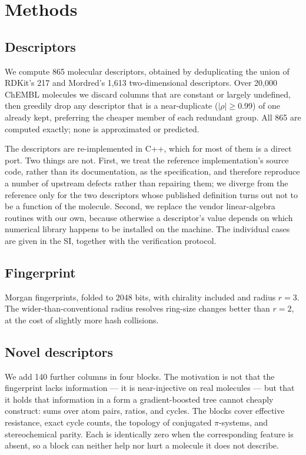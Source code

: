 \section{Methods}

\subsection{Descriptors}

We compute 865 molecular descriptors, obtained by deduplicating the union of RDKit's 217 and
Mordred's 1{,}613 two-dimensional descriptors. Over 20{,}000 ChEMBL molecules we discard columns
that are constant or largely undefined, then greedily drop any descriptor that is a
near-duplicate ($|\rho| \geq 0.99$) of one already kept, preferring the cheaper member of each
redundant group. All 865 are computed exactly; none is approximated or predicted.

The descriptors are re-implemented in C++, which for most of them is a direct port. Two things
are not. First, we treat the reference implementation's source code, rather than its
documentation, as the specification, and therefore reproduce a number of upstream defects rather
than repairing them; we diverge from the reference only for the two descriptors whose published
definition turns out not to be a function of the molecule. Second, we replace the vendor
linear-algebra routines with our own, because otherwise a descriptor's value depends on which
numerical library happens to be installed on the machine. The individual cases are given in the
SI, together with the verification protocol.

\subsection{Fingerprint}

Morgan fingerprints, folded to 2048 bits, with chirality included and radius $r = 3$. The
wider-than-conventional radius resolves ring-size changes better than $r = 2$, at the cost of
slightly more hash collisions.

\subsection{Novel descriptors}

We add 140 further columns in four blocks. The motivation is not that the fingerprint lacks
information --- it is near-injective on real molecules --- but that it holds that information in
a form a gradient-boosted tree cannot cheaply construct: sums over atom pairs, ratios, and
cycles. The blocks cover effective resistance, exact cycle counts, the topology of conjugated
$\pi$-systems, and stereochemical parity. Each is identically zero when the corresponding
feature is absent, so a block can neither help nor hurt a molecule it does not describe.

